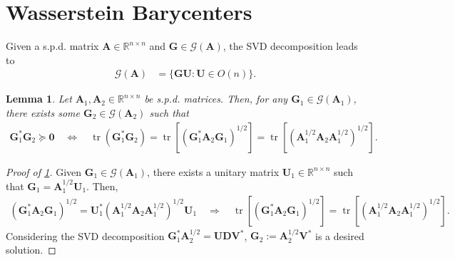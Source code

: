 \documentclass[noinfoline]{imsart}\setcounter{tocdepth}{2}
\renewcommand{\b}[1]{\mathbb{#1}} %
\newcommand{\m}[1]{\mathbf{#1}} %
\renewcommand{\c}[1]{\mathcal{#1}} %
\DeclareMathOperator*{\tr}{tr}
\theoremstyle{plain}
\newtheorem{lemma}[theorem]{Lemma}
\begin{document}
\section{Wasserstein Barycenters}\label{sec:bary}
Given a s.p.d. matrix $\m{A} \in \b{R}^{n \times n}$ and $\m{G} \in \c{G}(\m{A})$, the SVD decomposition leads to
\begin{align}\label{eq:Green's:right:inv}
    \c{G}(\m{A}) &= \{ \m{G} \m{U} : \m{U} \in O(n) \}.
\end{align}

\begin{lemma}\label{lem:opt:algn}
Let $\m{A}_{1}, \m{A}_{2}  \in \b{R}^{n \times n}$ be s.p.d. matrices. Then, for any $\m{G}_{1} \in \c{G}(\m{A}_{1})$, there exists some $\m{G}_{2} \in \c{G}(\m{A}_{2})$ such that
\begin{align*}
    \m{G}_{1}^{*} \m{G}_{2} \succeq \m{0} \quad \Leftrightarrow \quad \tr (\m{G}_{1}^{*} \m{G}_{2}) = \tr [(\m{G}_{1}^{*} \m{A}_{2} \m{G}_{1})^{1/2}] = \tr [(\m{A}_{1}^{1/2} \m{A}_{2} \m{A}_{1}^{1/2})^{1/2}].
\end{align*}
\end{lemma}
\begin{proof}[Proof of \cref{lem:opt:algn}]
Given $\m{G}_{1} \in \c{G}(\m{A}_{1})$, there exists a unitary matrix $\m{U}_{1} \in \b{R}^{n \times n}$ such that $\m{G}_{1} = \m{A}_{1}^{1/2} \m{U}_{1}$. Then,
\begin{align*}
    (\m{G}_{1}^{*} \m{A}_{2} \m{G}_{1})^{1/2} = \m{U}_{1}^{*} (\m{A}_{1}^{1/2} \m{A}_{2} \m{A}_{1}^{1/2})^{1/2} \m{U}_{1} \quad \Rightarrow \quad \tr [(\m{G}_{1}^{*} \m{A}_{2} \m{G}_{1})^{1/2}] = \tr [(\m{A}_{1}^{1/2} \m{A}_{2} \m{A}_{1}^{1/2})^{1/2}].
\end{align*}
Considering the SVD decomposition $\m{G}_{1}^{*} \m{A}_{2}^{1/2} = \m{U} \m{D} \m{V}^{*}$, $\m{G}_{2} := \m{A}_{2}^{1/2} \m{V}^{*}$ is a desired solution.
\end{proof}
\end{document}
